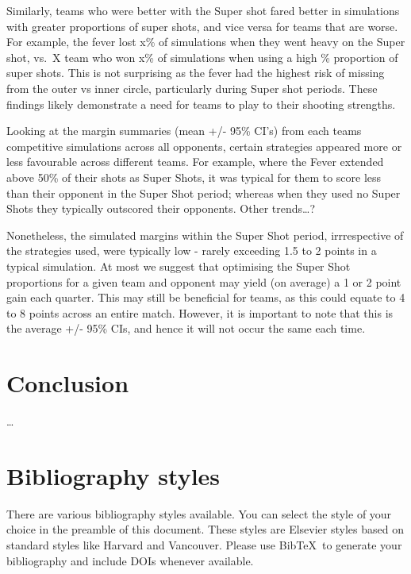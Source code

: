 \documentclass[]{elsarticle} %
\begin{document}
Similarly, teams who were better with the Super shot fared better in
simulations with greater proportions of super shots, and vice versa for
teams that are worse. For example, the fever lost x\% of simulations
when they went heavy on the Super shot, vs.~X team who won x\% of
simulations when using a high \% proportion of super shots. This is not
surprising as the fever had the highest risk of missing from the outer
vs inner circle, particularly during Super shot periods. These findings
likely demonstrate a need for teams to play to their shooting strengths.

Looking at the margin summaries (mean +/- 95\% CI's) from each teams
competitive simulations across all opponents, certain strategies
appeared more or less favourable across different teams. For example,
where the Fever extended above 50\% of their shots as Super Shots, it
was typical for them to score less than their opponent in the Super Shot
period; whereas when they used no Super Shots they typically outscored
their opponents. Other trends\ldots?

Nonetheless, the simulated margins within the Super Shot period,
irrrespective of the strategies used, were typically low - rarely
exceeding 1.5 to 2 points in a typical simulation. At most we suggest
that optimising the Super Shot proportions for a given team and opponent
may yield (on average) a 1 or 2 point gain each quarter. This may still
be beneficial for teams, as this could equate to 4 to 8 points across an
entire match. However, it is important to note that this is the average
+/- 95\% CIs, and hence it will not occur the same each time.

\hypertarget{conclusion}{%
\section{Conclusion}\label{conclusion}}

\ldots{}

\hypertarget{bibliography-styles}{%
\section{Bibliography styles}\label{bibliography-styles}}

There are various bibliography styles available. You can select the
style of your choice in the preamble of this document. These styles are
Elsevier styles based on standard styles like Harvard and Vancouver.
Please use BibTeX~to generate your bibliography and include DOIs
whenever available.
\end{document}
